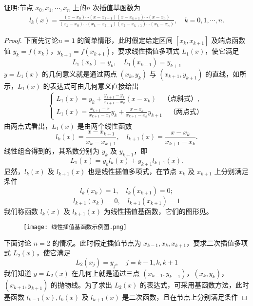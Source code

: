 \documentclass[../../main.tex]{subfiles}
\begin{document}
\begin{theorem}\label{theorem:插值基函数的求法}
证明:节点 $x_0, x_1, \cdots, x_n$ 上的$n$ 次插值基函数为 
\begin{align}
l_k(x) = \frac{(x - x_0) \cdots (x - x_{k - 1})(x - x_{k + 1}) \cdots (x - x_n)}{(x_k - x_0) \cdots (x_k - x_{k - 1})(x_k - x_{k + 1}) \cdots (x_k - x_n)}, \quad k = 0, 1, \cdots, n .\label{eq:::::-----------48--2.8}
\end{align}
\end{theorem}
\begin{proof}
下面先讨论$n = 1$ 的简单情形，此时假定给定区间 $[x_k, x_{k + 1}]$ 及端点函数值 $y_k = f(x_k)$，$y_{k + 1} = f(x_{k + 1})$，要求线性插值多项式 $L_1(x)$，使它满足 
\[
L_1(x_k) = y_k, \quad L_1(x_{k + 1}) = y_{k + 1}
\]
$y = L_1(x)$ 的几何意义就是通过两点 $(x_k, y_k)$ 与 $(x_{k + 1}, y_{k + 1})$ 的直线，如所示，$L_1(x)$ 的表达式可由几何意义直接给出 
\begin{align*}
\begin{cases} 
L_1(x) = y_k + \frac{y_{k + 1} - y_k}{x_{k + 1} - x_k}(x - x_k) \quad \text{（点斜式）}, \\ 
L_1(x) = \frac{x_{k + 1} - x}{x_{k + 1} - x_k} y_k + \frac{x - x_k}{x_{k + 1} - x_k} y_{k + 1} \quad \text{（两点式）} 
\end{cases}
\end{align*}
由两点式看出，$L_1(x)$ 是由两个线性函数 
\[
l_k(x) = \frac{x - x_{k + 1}}{x_k - x_{k + 1}}, \quad l_{k + 1}(x) = \frac{x - x_k}{x_{k + 1} - x_k} .
\]
线性组合得到的，其系数分别为 $y_k$ 及 $y_{k + 1}$，即 
\[
L_1(x) = y_k l_k(x) + y_{k + 1} l_{k + 1}(x).
\]
显然，$l_k(x)$ 及 $l_{k + 1}(x)$ 也是线性插值多项式，在节点 $x_k$ 及 $x_{k + 1}$ 上分别满足条件 
\[
l_k(x_k) = 1, \quad l_k(x_{k + 1}) = 0;
\]
\[
l_{k + 1}(x_k) = 0, \quad l_{k + 1}(x_{k + 1}) = 1
\]
我们称函数 $l_k(x)$ 及 $l_{k + 1}(x)$ 为{\heiti 线性插值基函数}，它们的图形见。
\begin{figure}[H]
\centering
\texttt{[image: 线性插值基函数示例图.png]}
\caption{}
\label{figure:线性插值基函数示例图}
\end{figure}
下面讨论 $n = 2$ 的情况。此时假定插值节点为 $x_{k - 1}, x_k, x_{k + 1}$，要求二次插值多项式 $L_2(x)$，使它满足 
\[
L_2(x_j) = y_j, \quad j = k - 1, k, k + 1
\]
我们知道 $y = L_2(x)$ 在几何上就是通过三点 $(x_{k - 1}, y_{k - 1})$，$(x_k, y_k)$，$(x_{k + 1}, y_{k + 1})$ 的抛物线。为了求出 $L_2(x)$ 的表达式，可采用基函数方法，此时基函数 $l_{k - 1}(x), l_k(x)$ 及 $l_{k + 1}(x)$ 是二次函数，且在节点上分别满足条件

\end{proof}
\end{document}
